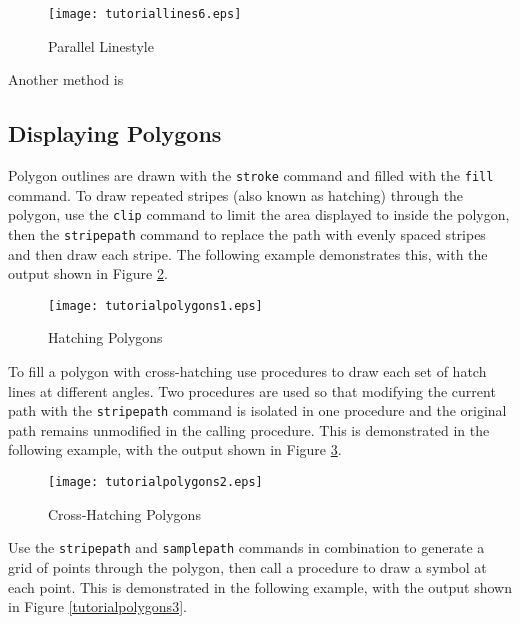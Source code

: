 

\begin{figure}[htb]
\texttt{[image: tutoriallines6.eps]}
\caption{Parallel Linestyle}
\label{tutoriallines6}
\end{figure}

Another method is

\subsection{Displaying Polygons}

Polygon outlines are drawn with the \texttt{stroke}
command and filled with the \texttt{fill} command.
To draw repeated stripes (also known as hatching) through
the polygon, use the \texttt{clip}
command to limit the area displayed to inside the polygon,
then the \texttt{stripepath}
command to replace the path with evenly spaced stripes and
then draw each stripe.  The following example demonstrates this,
with the output shown in Figure \ref{tutorialpolygons1}.



\begin{figure}[htb]
\texttt{[image: tutorialpolygons1.eps]}
\caption{Hatching Polygons}
\label{tutorialpolygons1}
\end{figure}

To fill a polygon with cross-hatching use procedures to
draw each set of hatch lines at different angles.  Two procedures
are used so that modifying the current path with the
\texttt{stripepath}
command is isolated in one procedure and the original path
remains unmodified in the calling procedure.
This is demonstrated in the following example, with the output
shown in Figure \ref{tutorialpolygons2}.



\begin{figure}[htb]
\texttt{[image: tutorialpolygons2.eps]}
\caption{Cross-Hatching Polygons}
\label{tutorialpolygons2}
\end{figure}

Use the \texttt{stripepath} and \texttt{samplepath}
commands in combination to generate a grid of points through the
polygon, then call a procedure to draw a symbol at each point.
This is demonstrated in the following example, with the output
shown in Figure \ref{tutorialpolygons3}.



